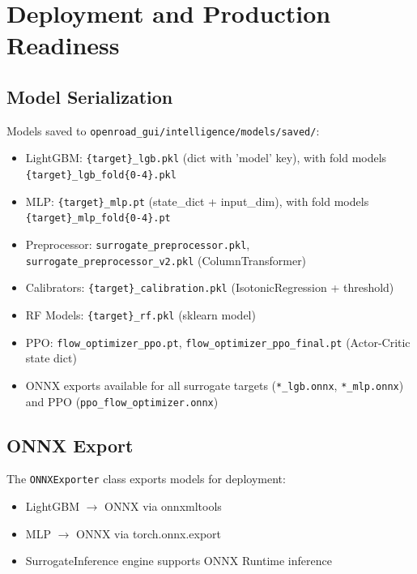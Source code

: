 \documentclass[10pt,conference]{IEEEtran}
\begin{document}
\begin{table}[t]

\section{Deployment and Production Readiness}
\label{sec:deployment}

\subsection{Model Serialization}

Models saved to \texttt{openroad\_gui/intelligence/models/saved/}:
\begin{itemize}
    \item LightGBM: \texttt{\{target\}\_lgb.pkl} (dict with 'model' key), with fold models \texttt{\{target\}\_lgb\_fold\{0-4\}.pkl}
    \item MLP: \texttt{\{target\}\_mlp.pt} (state\_dict + input\_dim), with fold models \texttt{\{target\}\_mlp\_fold\{0-4\}.pt}
    \item Preprocessor: \texttt{surrogate\_preprocessor.pkl}, \texttt{surrogate\_preprocessor\_v2.pkl} (ColumnTransformer)
    \item Calibrators: \texttt{\{target\}\_calibration.pkl} (IsotonicRegression + threshold)
    \item RF Models: \texttt{\{target\}\_rf.pkl} (sklearn model)
    \item PPO: \texttt{flow\_optimizer\_ppo.pt}, \texttt{flow\_optimizer\_ppo\_final.pt} (Actor-Critic state dict)
    \item ONNX exports available for all surrogate targets (\texttt{*\_lgb.onnx}, \texttt{*\_mlp.onnx}) and PPO (\texttt{ppo\_flow\_optimizer.onnx})
\end{itemize}

\subsection{ONNX Export}

The \texttt{ONNXExporter} class exports models for deployment:
\begin{itemize}
    \item LightGBM $\rightarrow$ ONNX via onnxmltools
    \item MLP $\rightarrow$ ONNX via torch.onnx.export
    \item SurrogateInference engine supports ONNX Runtime inference
\end{itemize}


\end{table}
\end{document}
